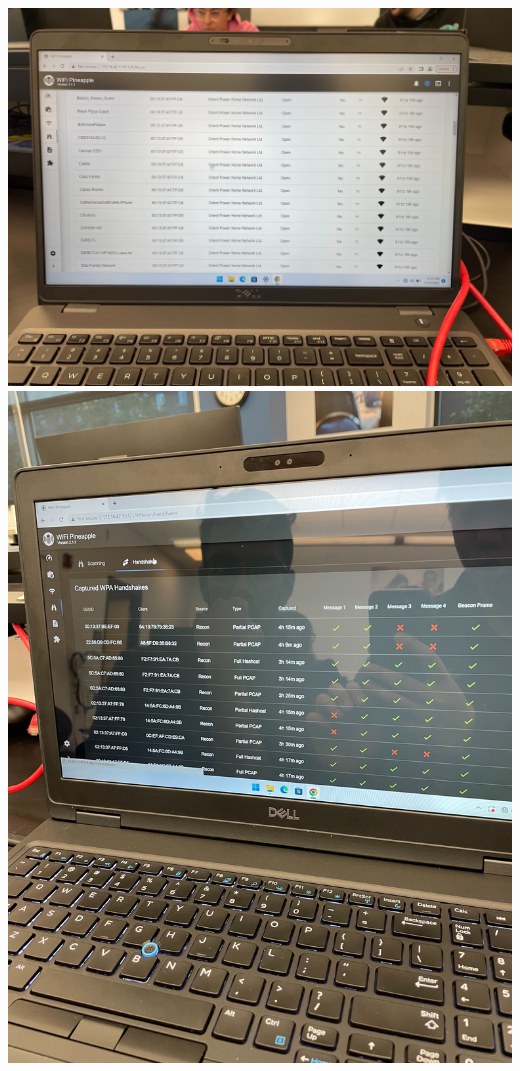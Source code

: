 \documentclass[12pt]{article}
\begin{document}
\begin{center}
    \includegraphics[scale=.07]{images/q3_scan1.jpg}
    \includegraphics[scale=.07]{images/q3_handshake.jpg}
\end{center}
\end{document}
